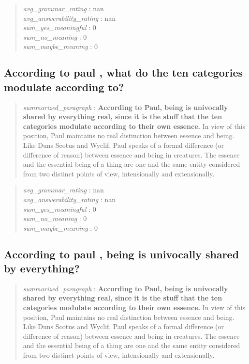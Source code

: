 \begin{quote}
\emph{avg\_grammar\_rating} : nan\\
\emph{avg\_answerability\_rating} : nan\\
\emph{sum\_yes\_meaningful} : 0\\
\emph{sum\_no\_meaning} : 0\\
\emph{sum\_maybe\_meaning} : 0
\end{quote}

\hypertarget{according-to-paul-what-do-the-ten-categories-modulate-according-to}{%
\subsection{According to paul , what do the ten categories modulate
according
to?}\label{according-to-paul-what-do-the-ten-categories-modulate-according-to}}

\begin{quote}
\emph{summarized\_paragraph} : \textbf{According to Paul, being is
univocally shared by everything real, since it is the stuff that the ten
categories modulate according to their own essence.} In view of this
position, Paul maintains no real distinction between essence and being.
Like Duns Scotus and Wyclif, Paul speaks of a formal difference (or
difference of reason) between essence and being in creatures. The
essence and the essential being of a thing are one and the same entity
considered from two distinct points of view, intensionally and
extensionally.
\end{quote}

\begin{quote}
\emph{avg\_grammar\_rating} : nan\\
\emph{avg\_answerability\_rating} : nan\\
\emph{sum\_yes\_meaningful} : 0\\
\emph{sum\_no\_meaning} : 0\\
\emph{sum\_maybe\_meaning} : 0
\end{quote}

\hypertarget{according-to-paul-being-is-univocally-shared-by-everything}{%
\subsection{According to paul , being is univocally shared by
everything?}\label{according-to-paul-being-is-univocally-shared-by-everything}}

\begin{quote}
\emph{summarized\_paragraph} : \textbf{According to Paul, being is
univocally shared by everything real, since it is the stuff that the ten
categories modulate according to their own essence.} In view of this
position, Paul maintains no real distinction between essence and being.
Like Duns Scotus and Wyclif, Paul speaks of a formal difference (or
difference of reason) between essence and being in creatures. The
essence and the essential being of a thing are one and the same entity
considered from two distinct points of view, intensionally and
extensionally.
\end{quote}

